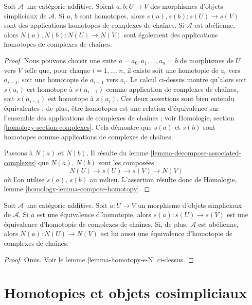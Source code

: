 \begin{lemma}
\label{lemma-homotopy-s-N}
Soit $\mathcal{A}$ une catégorie additive. Soient $a, b : U \to V$ des
morphismes d'objets simpliciaux de $\mathcal{A}$. Si $a$, $b$ sont homotopes,
alors $s(a), s(b) : s(U) \to s(V)$ sont des applications homotopes de
complexes de chaînes. Si $\mathcal{A}$ est abélienne, alors
$N(a), N(b) : N(U) \to N(V)$ sont également des applications homotopes de
complexes de chaînes.
\end{lemma}

\begin{proof}
Nous pouvons choisir une suite $a = a_0, a_1, \ldots, a_n = b$ de morphismes
de $U$ vers $V$ telle que, pour chaque $i = 1, \ldots, n$, il existe soit une
homotopie de $a_i$ vers $a_{i - 1}$, soit une homotopie de
$a_{i - 1}$ vers $a_i$. Le calcul ci-dessus montre qu'alors soit
$s(a_i)$ est homotope à $s(a_{i - 1})$ comme application de complexes de
chaînes, soit $s(a_{i - 1})$ est homotope à $s(a_i)$. Ces deux assertions
sont bien entendu équivalentes ; de plus, être homotopes est une relation
d'équivalence sur l'ensemble des applications de complexes de chaînes ; voir
Homologie, section \ref{homology-section-complexes}.
Cela démontre que $s(a)$ et $s(b)$ sont homotopes comme applications de
complexes de chaînes.

\medskip\noindent
Passons à $N(a)$ et $N(b)$. Il résulte du
lemme \ref{lemma-decompose-associated-complexes} que
$N(a)$, $N(b)$ sont les composées
$$
N(U) \to s(U) \to s(V) \to N(V)
$$
où l'on utilise $s(a)$, $s(b)$ au milieu. L'assertion résulte donc de
Homologie, lemme \ref{homology-lemma-compose-homotopy}.
\end{proof}

\begin{lemma}
\label{lemma-homotopy-equivalence-s-N}
Soit $\mathcal{A}$ une catégorie additive. Soit $a : U \to V$ un morphisme
d'objets simpliciaux de $\mathcal{A}$. Si $a$ est une équivalence d'homotopie,
alors $s(a) : s(U) \to s(V)$ est une équivalence d'homotopie de complexes de
chaînes. Si, de plus, $\mathcal{A}$ est abélienne, alors
$N(a) : N(U) \to N(V)$ est lui aussi une équivalence d'homotopie de complexes de chaînes.
\end{lemma}

\begin{proof}
Omis. Voir le lemme \ref{lemma-homotopy-s-N} ci-dessus.
\end{proof}




\section{Homotopies et objets cosimpliciaux}
\label{section-homotopy-cosimplicial}

